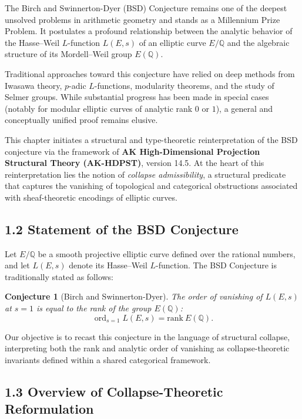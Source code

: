 \documentclass[11pt]{article}
\newtheorem{conjecture}{Conjecture}[section]
\newcommand{\ord}{\operatorname{ord}}
\begin{document}
The Birch and Swinnerton-Dyer (BSD) Conjecture remains one of the deepest unsolved problems in arithmetic geometry and stands as a Millennium Prize Problem. It postulates a profound relationship between the analytic behavior of the Hasse–Weil \( L \)-function \( L(E, s) \) of an elliptic curve \( E/\mathbb{Q} \) and the algebraic structure of its Mordell–Weil group \( E(\mathbb{Q}) \).

Traditional approaches toward this conjecture have relied on deep methods from Iwasawa theory, \( p \)-adic \( L \)-functions, modularity theorems, and the study of Selmer groups. While substantial progress has been made in special cases (notably for modular elliptic curves of analytic rank \( 0 \) or \( 1 \)), a general and conceptually unified proof remains elusive.

This chapter initiates a structural and type-theoretic reinterpretation of the BSD conjecture via the framework of \textbf{AK High-Dimensional Projection Structural Theory (AK-HDPST)}, version 14.5. At the heart of this reinterpretation lies the notion of \emph{collapse admissibility}, a structural predicate that captures the vanishing of topological and categorical obstructions associated with sheaf-theoretic encodings of elliptic curves.

\subsection*{1.2 Statement of the BSD Conjecture}

Let \( E/\mathbb{Q} \) be a smooth projective elliptic curve defined over the rational numbers, and let \( L(E,s) \) denote its Hasse–Weil \( L \)-function. The BSD Conjecture is traditionally stated as follows:

\begin{conjecture}[Birch and Swinnerton-Dyer]
\label{conj:bsd-classical}
The order of vanishing of \( L(E,s) \) at \( s = 1 \) is equal to the rank of the group \( E(\mathbb{Q}) \):
\[
\ord_{s=1} L(E,s) = \mathrm{rank}~E(\mathbb{Q}).
\]
\end{conjecture}

Our objective is to recast this conjecture in the language of structural collapse, interpreting both the rank and analytic order of vanishing as collapse-theoretic invariants defined within a shared categorical framework.

\subsection*{1.3 Overview of Collapse-Theoretic Reformulation}
\end{document}
